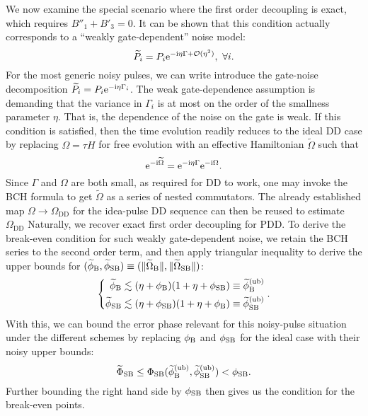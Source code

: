 \documentclass[b5paper,11pt]{article}
\newcommand{\wtP}{\widetilde{P}}
\newcommand{\wtO}{\widetilde{\Omega}}
\newcommand{\rDD}{\mathrm{DD}}
\begin{document}
We now examine the special scenario where the first order decoupling is exact, which requires $B''_1+B'_3=0$. It can be shown that this condition actually corresponds to a ``weakly gate-dependent'' noise model:
\begin{equation}\label{eq:gateindep1}
 \wtP_i = P_i \upe^{-\upi \eta \Gamma + \cO(\eta^2)},\ \forall i.
\end{equation}
For the most generic noisy pulses, we can write introduce the gate-noise decomposition $\wtP_i = P_i \upe^{-\upi \eta \Gamma_i}$. The weak gate-dependence assumption is demanding that the variance in $\Gamma_i$  
is at most on the order of the smallness parameter $\eta$.
 That is, the dependence of the noise on the gate is weak. If this condition is 
 satisfied, then the time evolution readily reduces to the ideal DD case by replacing $\Omega=\tau H$ for free evolution with an effective Hamiltonian $\wtO$ such that
\begin{equation}
\upe^{-\upi \wtO}=\upe^{-\upi \eta \Gamma}\upe^{-\upi \Omega}.
\end{equation}
Since $\Gamma$ and $\Omega$ are both small, as required for DD to work,
one may invoke the BCH formula to get $\wtO$ as a series of nested commutators. 
The already established map $\Omega\to \Omega_{\rDD}$ for the idea-pulse DD sequence can then be reused to estimate $\Omega_{\rDD}$
Naturally, we recover exact first order decoupling for PDD. To derive the break-even condition for such weakly gate-dependent noise, 
we retain the BCH series to the second order term, and then apply triangular inequality to derive the upper bounds for $(\widetilde\phi_\rB,\widetilde{\phi}_\rSB) \equiv( \norm{\wtO_\rB}, \norm{\wtO_\rSB})$:
\begin{equation}\label{eq:comb-bound}
\left\{
\begin{aligned}
 \widetilde\phi_{\mathrm{B}} &\lesssim (\eta + \phi_{\mathrm{B}})(1+\eta + \phi_{\mathrm{SB}}) \equiv \widetilde\phi_{\mathrm{B}}^{(\mathrm{ub})}\\
 \widetilde\phi_{\mathrm{SB}} &\lesssim (\eta + \phi_{\mathrm{SB}}) (1+\eta + \phi_{\mathrm{B}})\equiv \widetilde\phi_{\mathrm{SB}}^{(\mathrm{ub})}
\end{aligned}
\right..
\end{equation}
With this, we can bound the error phase relevant for this noisy-pulse situation under the different schemes by replacing $\phi_{\mathrm{B}}$ and $\phi_{\mathrm{SB}}$ for the ideal case with their noisy upper bounds: 
\begin{equation}
 \widetilde\Phi_{\mathrm{SB}} \le \Phi_{\mathrm{SB}}(\widetilde\phi_{\mathrm{B}}^{(\mathrm{ub})}  ,\widetilde\phi_{\mathrm{SB}}^{(\mathrm{ub})} ) < \phi_{\mathrm{SB}}.
\end{equation}
Further bounding the right hand side by $\phi_{\mathrm{SB}}$ then gives us the condition for the break-even points.
\end{document}
